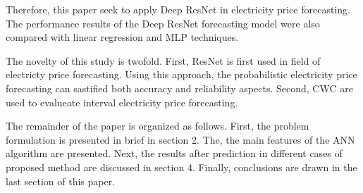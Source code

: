 \documentclass[review]{elsarticle}
\begin{document}
    Therefore, this paper seek to apply Deep ResNet in electricity price forecasting.
    The performance results of the Deep ResNet forecasting model were also compared with linear regression and MLP techniques.

    The novelty of this study is twofold.
    First, ResNet is first used in field of electricty price forecasting. Using this approach, the probabilistic electricity price forecasting can sastified both accuracy and reliability aspects.
    Second, CWC are used to evalueate interval electricity price forecasting.


    The remainder of the paper is organized as follows.
    First, the problem formulation is presented in brief in section 2.
    The, the main features of the ANN algorithm are presented.
    Next, the results after prediction in different cases of proposed method  are discussed in section 4.
    Finally, conclusions are drawn in the last section of this paper.
\end{document}
